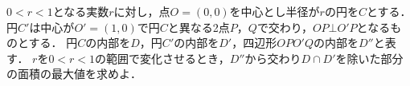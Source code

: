 \documentclass[../../main.tex]{subfiles}
\begin{document}
$0<r<1$となる実数$r$に対し，点$O=(0,0)$を中心とし半径が$r$の円を$C$とする．
円$C'$は中心が$O'=(1,0)$で円$C$と異なる2点$P$，$Q$で交わり，$OP \bot O'P$となるものとする．
円$C$の内部を$D$，円$C'$の内部を$D'$，四辺形$OPO'Q$の内部を$D''$と表す．
$r$を$0<r<1$の範囲で変化させるとき，$D''$から交わり$D \cap D'$を除いた部分の面積の最大値を求めよ．
\end{document}
